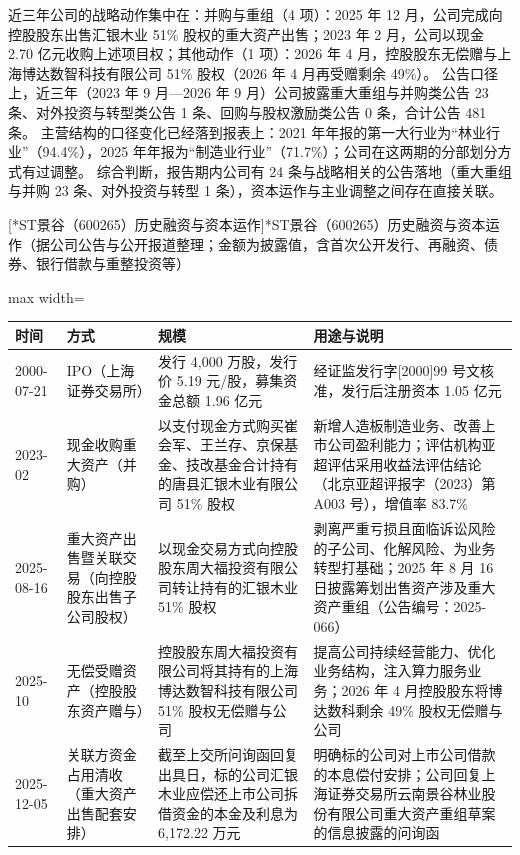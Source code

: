  近三年公司的战略动作集中在：并购与重组（4 项）：2025 年 12 月，公司完成向控股股东出售汇银木业 51\% 股权的重大资产出售；2023 年 2 月，公司以现金 2.70 亿元收购上述项目权；其他动作（1 项）：2026 年 4 月，控股股东无偿赠与上海博达数智科技有限公司 51\% 股权（2026 年 4 月再受赠剩余 49\%）。 公告口径上，近三年（2023 年 9 月---2026 年 9 月）公司披露重大重组与并购类公告 23 条、对外投资与转型类公告 1 条、回购与股权激励类公告 0 条，合计公告 481 条。 主营结构的口径变化已经落到报表上：2021 年年报的第一大行业为“林业行业”（94.4\%），2025 年年报为“制造业行业”（71.7\%）；公司在这两期的分部划分方式有过调整。 综合判断，报告期内公司有 24 条与战略相关的公告落地（重大重组与并购 23 条、对外投资与转型 1 条），资本运作与主业调整之间存在直接关联。

\begin{center}\small\setlength{\tabcolsep}{4pt}
[*ST景谷（600265）历史融资与资本运作]{*ST景谷（600265）历史融资与资本运作（据公司公告与公开报道整理；金额为披露值，含首次公开发行、再融资、债券、银行借款与重整投资等）}
\begin{adjustbox}{max width=\textwidth}
\begin{tabular}{@{}p{1.45cm}p{2.55cm}p{4.05cm}p{4.95cm}@{}}
\toprule
时间 & 方式 & 规模 & 用途与说明 \\
\midrule
2000-07-21 & IPO（上海证券交易所） & 发行 4,\allowbreak{}000 万股，\allowbreak{}发行价 5.19 元/\allowbreak{}股，\allowbreak{}募集资金总额 1.96 亿元 & 经证监发行字[2000]99 号文核准，\allowbreak{}发行后注册资本 1.05 亿元 \\
2023-02 & 现金收购重大资产（并购） & 以支付现金方式购买崔会军、\allowbreak{}王兰存、\allowbreak{}京保基金、\allowbreak{}技改基金合计持有的唐县汇银木业有限公司 51\% 股权 & 新增人造板制造业务、\allowbreak{}改善上市公司盈利能力；评估机构亚超评估采用收益法评估结论（北京亚超评报字（2023）第 A003 号），\allowbreak{}增值率 83.7\% \\
2025-08-16 & 重大资产出售暨关联交易（向控股股东出售子公司股权） & 以现金交易方式向控股股东周大福投资有限公司转让持有的汇银木业 51\% 股权 & 剥离严重亏损且面临诉讼风险的子公司、\allowbreak{}化解风险、\allowbreak{}为业务转型打基础；2025 年 8 月 16 日披露筹划出售资产涉及重大资产重组（公告编号：2025-066） \\
2025-10 & 无偿受赠资产（控股股东资产赠与） & 控股股东周大福投资有限公司将其持有的上海博达数智科技有限公司 51\% 股权无偿赠与公司 & 提高公司持续经营能力、\allowbreak{}优化业务结构，\allowbreak{}注入算力服务业务；2026 年 4 月控股股东将博达数科剩余 49\% 股权无偿赠与公司 \\
2025-12-05 & 关联方资金占用清收（重大资产出售配套安排） & 截至上交所问询函回复出具日，\allowbreak{}标的公司汇银木业应偿还上市公司拆借资金的本金及利息为 6,\allowbreak{}172.22 万元 & 明确标的公司对上市公司借款的本息偿付安排；公司回复上海证券交易所云南景谷林业股份有限公司重大资产重组草案的信息披露的问询函 \\
\bottomrule
\end{tabular}
\end{adjustbox}
\end{center}

